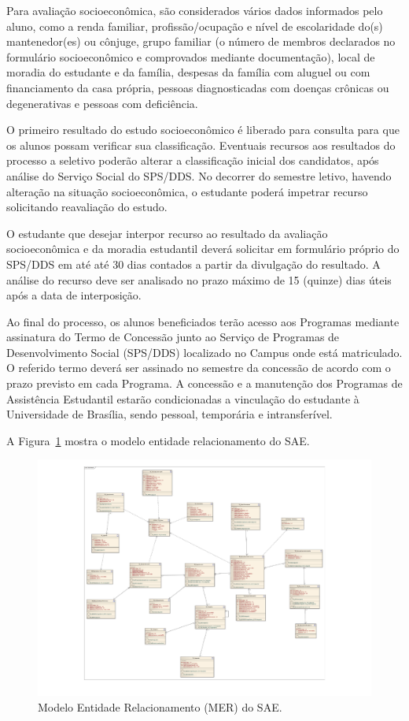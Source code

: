 Para avaliação socioeconômica, são considerados vários dados informados pelo aluno, como a renda familiar, profissão/ocupação e nível de escolaridade do(s) mantenedor(es) ou cônjuge, grupo familiar (o número de membros declarados no formulário socioeconômico e
comprovados mediante documentação), local de moradia do estudante e da família, despesas da família com aluguel ou com financiamento da casa própria, pessoas diagnosticadas com doenças crônicas ou degenerativas e pessoas com deficiência.

O primeiro resultado do estudo socioeconômico é liberado para consulta para que os alunos possam verificar sua classificação. Eventuais recursos aos resultados do processo a seletivo poderão alterar a classificação inicial dos candidatos, após análise do Serviço Social do SPS/DDS. No decorrer do semestre letivo, havendo alteração na situação socioeconômica, o estudante poderá impetrar recurso solicitando reavaliação do estudo. 

O estudante que desejar interpor recurso ao resultado da avaliação socioeconômica e da moradia estudantil deverá solicitar em formulário próprio do SPS/DDS em até até 30 dias contados a partir da divulgação do resultado. A análise do recurso deve ser analisado no prazo máximo de 15 (quinze) dias úteis após a data de interposição.

Ao final do processo, os alunos beneficiados terão acesso aos Programas mediante assinatura do Termo de Concessão junto ao Serviço de Programas de Desenvolvimento Social (SPS/DDS) localizado no Campus onde está matriculado. O referido termo deverá ser assinado no semestre da concessão de acordo com o prazo previsto em cada Programa. A concessão e a manutenção dos Programas de Assistência Estudantil estarão condicionadas a vinculação do estudante à Universidade de Brasília, sendo pessoal, temporária e intransferível.

A Figura~\ref{fig:ER_SAE} mostra o modelo entidade relacionamento do \acrshort{SAE}.

\begin{figure}[ht]
\advance\leftskip-4cm
\includegraphics[scale=0.8]{img/sae.pdf}
\caption{Modelo Entidade Relacionamento (MER) do SAE.}
\label{fig:ER_SAE}
\end{figure}


